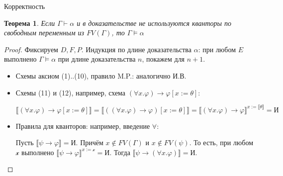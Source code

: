 \documentclass[aspectratio=169]{beamer}
\newtheorem{thm}{Теорема}[section]
\begin{document}
\begin{frame}{Корректность}
\begin{thm}Если $\Gamma \vdash \alpha$ и в доказательстве не используются кванторы по свободным переменным из $FV(\Gamma)$, то $\Gamma \models \alpha$\end{thm}
\begin{proof}Фиксируем $D, F, P$. Индукция по длине доказательства $\alpha$: при любом $E$ выполнено $\Gamma\models\alpha$ 
при длине доказательства $n$, покажем для $n+1$. 
\begin{itemize}
\item Схемы аксиом (1)..(10), правило M.P.: аналогично И.В.
\item Схемы (11) и (12), например, схема $(\forall x.\varphi) \rightarrow \varphi [x := \theta]$: \vspace{-0.6cm}

$$\llbracket (\forall x.\varphi) \rightarrow \varphi [x := \theta]\rrbracket = \llbracket ((\forall x.\varphi) \rightarrow \varphi) [x := \theta] \rrbracket =
  \llbracket (\forall x.\varphi) \rightarrow \varphi \rrbracket ^ { x := \llbracket\theta\rrbracket } = \text{И}$$

\item Правила для кванторов: например, введение $\forall$:

  Пусть $\llbracket \psi \rightarrow \varphi \rrbracket = \text{И}$. Причём $x \notin FV(\Gamma)$ и $x \notin FV(\psi)$. То есть,
  при любом $\mathcal{x}$ выполнено $\llbracket \psi \rightarrow \varphi \rrbracket^{x := \mathcal{x}} = \text{И}$. Тогда
  $\llbracket \psi \rightarrow (\forall x.\varphi) \rrbracket = \text{И}$.

\end{itemize}
\end{proof}
\end{frame}
\end{document}
